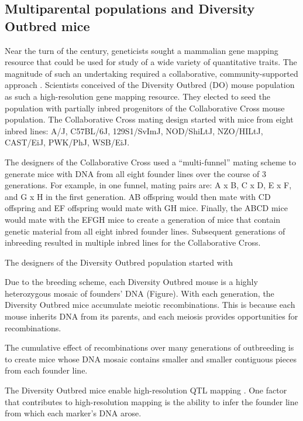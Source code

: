 \documentclass[]{article}\usepackage[]{graphicx}\usepackage[]{color}
\begin{document}
\subsection{Multiparental populations and Diversity Outbred mice}

Near the turn of the century, geneticists sought a mammalian gene mapping resource 
that could be used for study of a wide variety of quantitative traits. 
The magnitude of such an undertaking required a collaborative, community-supported approach \citep{de2014genetics}. Scientists conceived of the Diversity Outbred (DO) mouse population as such a high-resolution gene mapping resource. They elected to seed the population with partially inbred progenitors of the Collaborative Cross mouse population. The Collaborative Cross mating design started with mice from eight inbred lines: A/J, C57BL/6J, 129S1/SvImJ, NOD/ShiLtJ, NZO/HILtJ, CAST/EiJ, PWK/PhJ, WSB/EiJ.

The designers of the Collaborative Cross used a ``multi-funnel'' mating scheme to generate mice with DNA from all eight founder lines over the course of 3 generations. For example, in one funnel, mating pairs are: A x B, C x D, E x F, and G x H in the first generation. AB offspring would then mate with CD offspring and EF offspring would mate with GH mice. Finally, the ABCD mice would mate with the EFGH mice to create a generation of mice that contain genetic material from all eight inbred founder lines. Subsequent generations of inbreeding resulted in multiple inbred lines for the Collaborative Cross. 

The designers of the Diversity Outbred population started with 

Due to the breeding scheme, each Diversity Outbred mouse is a highly heterozygous mosaic of 
founders' DNA (Figure). 
With each generation, the Diversity Outbred mice accumulate meiotic recombinations. 
This is because each mouse inherits DNA from its parents, and each meiosis provides opportunities for recombinations. 

The cumulative effect of recombinations over many generations of outbreeding is to create mice whose DNA mosaic contains smaller and smaller contiguous pieces from each founder line. 

The Diversity Outbred mice enable high-resolution QTL mapping \citep{gatti2014quantitative}. One factor that contributes to high-resolution mapping is the ability to infer the founder line from which each marker's DNA arose. 
\end{document}
